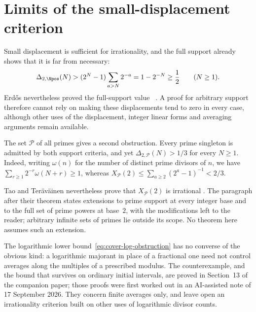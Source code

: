 \documentclass[11pt]{article}
\begin{document}
\section{Limits of the small-displacement criterion}\label{sec:map}
Small displacement is sufficient for irrationality, and the full
support already shows that it is far from necessary:
\[
 \Delta_{2,\Npos}(N)
 >(2^N-1)\sum_{a>N}2^{-a}=1-2^{-N}\ge\frac12
 \qquad(N\ge1).
\]
Erd\H{o}s nevertheless proved the full-support value
~\cite{erdos1948}.
A proof for arbitrary support therefore cannot rely on making these
displacements tend to zero in every case, although other uses of the
displacement, integer linear forms and averaging arguments remain
available.

The set $\mathcal P$ of all primes gives a second obstruction. Every
prime singleton is admitted by both support criteria, and yet
$\Delta_{2,\mathcal P}(N)>1/3$ for every $N\ge1$. Indeed, writing
$\omega(n)$ for the number of distinct prime divisors of $n$, we have
$\sum_{r\ge1}2^{-r}\omega(N+r)\ge1$, whereas
$X_{\mathcal P}(2)\le\sum_{a\ge2}(2^a-1)^{-1}<2/3$.


Tao and Ter\"av\"ainen nevertheless prove that $X_{\mathcal P}(2)$ is
irrational \cite[Theorem~1.3, p.~4]{taoteravainen2025}. The paragraph
after their theorem states extensions to prime support at every
integer base and to the full set of prime powers at base~$2$, with the
modifications left to the reader; arbitrary infinite sets of primes lie
outside its scope. No theorem here assumes such an extension.


The logarithmic lower bound~\eqref{eq:cover-log-obstruction} has no
converse of the obvious kind: a logarithmic majorant in place of a
fractional one need not control averages along the multiples of a
prescribed modulus. The counterexample, and the bound that survives on
ordinary initial intervals, are proved in
{Section~13 of the companion paper}; those proofs were first worked
out in an AI-assisted note of 17 September 2026. They concern finite
averages only, and leave open an irrationality criterion built on other
uses of logarithmic divisor counts.
\end{document}
